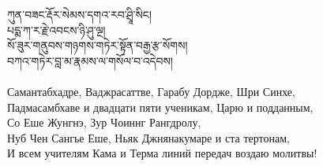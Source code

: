 
\ru


{\ti
ཀུན་བཟང་རྡོར་སེམས་དགའ་རབ་ཤྲཱི་སིང།\\
པདྨ་ཀ་ར་རྗེ་འབངས་ཉི་ཤུ་ལྔ།\\
སོ་ཟུར་གནུབས་གཉགས་གཏེར་སྟོན་བརྒྱ་རྩ་སོགས།\\
བཀའ་གཏེར་བླ་མ་རྣམས་ལ་གསོལ་བ་འདེབས།}\\
\\
\ru
Самантабхадре, Ваджрасаттве, Гарабу Дордже, Шри Синхе,\\
Падмасамбхаве и двадцати пяти ученикам, Царю и подданным,\\
Со Еше Жунгнэ, Зур Чоиннг Рангдролу,\\
Нуб Чен Сангье Еше, Ньяк Джнянакумаре и ста тертонам,\\
И всем учителям Кама и Терма линий передач воздаю молитвы!\\
\\


